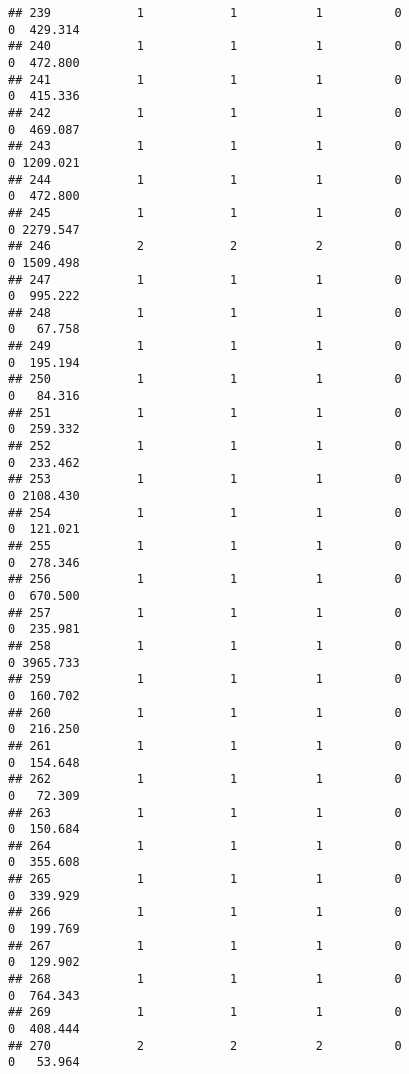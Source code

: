 \documentclass[
]{article}
\begin{document}
\begin{verbatim}
## 239            1            1           1          0                0  429.314
## 240            1            1           1          0                0  472.800
## 241            1            1           1          0                0  415.336
## 242            1            1           1          0                0  469.087
## 243            1            1           1          0                0 1209.021
## 244            1            1           1          0                0  472.800
## 245            1            1           1          0                0 2279.547
## 246            2            2           2          0                0 1509.498
## 247            1            1           1          0                0  995.222
## 248            1            1           1          0                0   67.758
## 249            1            1           1          0                0  195.194
## 250            1            1           1          0                0   84.316
## 251            1            1           1          0                0  259.332
## 252            1            1           1          0                0  233.462
## 253            1            1           1          0                0 2108.430
## 254            1            1           1          0                0  121.021
## 255            1            1           1          0                0  278.346
## 256            1            1           1          0                0  670.500
## 257            1            1           1          0                0  235.981
## 258            1            1           1          0                0 3965.733
## 259            1            1           1          0                0  160.702
## 260            1            1           1          0                0  216.250
## 261            1            1           1          0                0  154.648
## 262            1            1           1          0                0   72.309
## 263            1            1           1          0                0  150.684
## 264            1            1           1          0                0  355.608
## 265            1            1           1          0                0  339.929
## 266            1            1           1          0                0  199.769
## 267            1            1           1          0                0  129.902
## 268            1            1           1          0                0  764.343
## 269            1            1           1          0                0  408.444
## 270            2            2           2          0                0   53.964

\end{verbatim}
\end{document}
